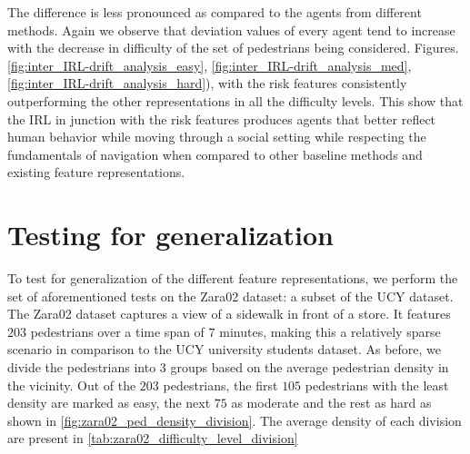 The difference is less pronounced as compared to the agents from different methods. Again we observe that deviation values of every agent tend to increase with the decrease in difficulty of the set of pedestrians being considered. Figures. \ref{fig:inter_IRL-drift_analysis_easy}, \ref{fig:inter_IRL-drift_analysis_med}, \ref{fig:inter_IRL-drift_analysis_hard}), with the risk features consistently outperforming the other representations in all the difficulty levels. This show that the IRL in junction with the risk features produces agents that better reflect human behavior while moving through a social setting while respecting the fundamentals of navigation when compared to other baseline methods and existing feature representations.


\section{Testing for generalization}
\label{sec:generalization}
To test for generalization of the different feature representations, we perform the set of aforementioned tests on the Zara02 dataset: a subset of the UCY dataset. The Zara02 dataset captures a view of a sidewalk in front of a store. It features $203$ pedestrians over a time span of $7$ minutes, making this a relatively sparse scenario in comparison to the UCY university students dataset. As before, we divide the pedestrians into 3 groups based on the average pedestrian density in the vicinity. Out of the $203$ pedestrians, the first $105$ pedestrians with the least density are marked as easy, the next $75$ as moderate and the rest as hard as shown in \autoref{fig:zara02_ped_density_division}. The average density of each division are present in \autoref{tab:zara02_difficulty_level_division}


